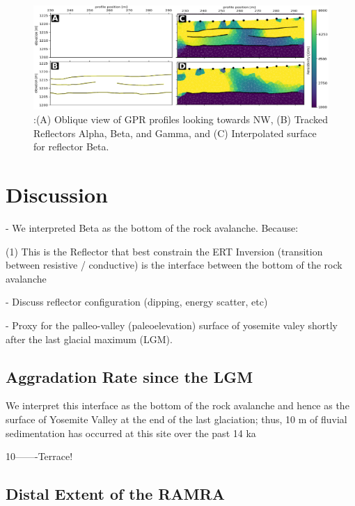 \documentclass[5p]{elsarticle}
\begin{document}
                                \begin{figure}[h]

	\includegraphics[width=\textwidth]{Figures/Combined_ABCD.pdf}
		\caption{:(A) Oblique view of GPR profiles looking towards NW, (B) Tracked Reflectors Alpha, Beta, and Gamma, and (C) Interpolated surface for reflector Beta. \label{Combined_ABCD}}

								   \end{figure}





\section{Discussion}

- We interpreted Beta as the bottom of the rock avalanche. Because: 

	(1) This is the Reflector that best constrain the ERT Inversion (transition between resistive / 	conductive) is the interface between the bottom of the rock avalanche


- Discuss reflector configuration (dipping, energy scatter, etc) 


- Proxy for the palleo-valley (paleoelevation)  surface of yosemite valey shortly after the last glacial maximum (LGM).



\subsection{Aggradation Rate since the LGM}

We interpret this interface as the bottom of the rock avalanche and hence as the surface of Yosemite Valley at the end of the last glaciation; thus,   10 m of fluvial sedimentation has occurred at this site over the past 14 ka

10-------Terrace!


\subsection{Distal Extent of the RAMRA}
\end{document}
